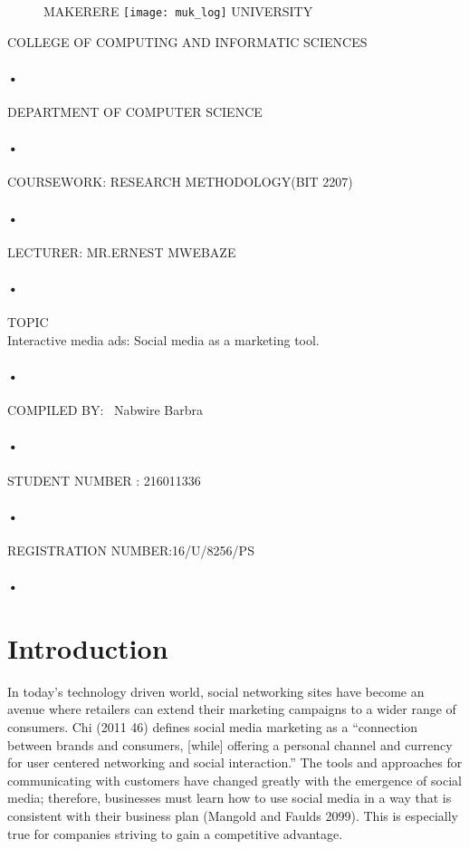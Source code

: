 \documentclass[10pt]{article}
\begin{document}


\begin{titlepage}
  \begin{figure}[h]
  \centerline{\small MAKERERE 
  \texttt{[image: muk\_log]} UNIVERSITY}
\end{figure}
\centerline{COLLEGE OF COMPUTING AND INFORMATIC SCIENCES}
\paragraph{•}
\centerline{DEPARTMENT OF COMPUTER SCIENCE\\}
\paragraph{•}
\centerline{COURSEWORK: RESEARCH METHODOLOGY(BIT 2207)\\}
\paragraph{•}
\centerline{LECTURER: MR.ERNEST MWEBAZE}
\paragraph{•}
\centerline{TOPIC\\ Interactive media ads: Social media as a marketing tool.}  
\paragraph{•}
\centerline{COMPILED BY: \
 Nabwire Barbra}
 \paragraph{•}
\centerline{STUDENT NUMBER : 216011336 }
\paragraph{•}
\centerline{REGISTRATION NUMBER:16/U/8256/PS}
\paragraph{•}
\end{titlepage}
\newpage
{}
\section{Introduction}
In today’s technology driven world, social networking sites have become an avenue
where retailers can extend their marketing campaigns to a wider range of consumers. Chi (2011
46) defines social media marketing as a “connection between brands and consumers, [while]
offering a personal channel and currency for user centered networking and social interaction.”
The tools and approaches for communicating with customers have changed greatly with the
emergence of social media; therefore, businesses must learn how to use social media in a way
that is consistent with their business plan (Mangold and Faulds 2099). This is especially true for
companies striving to gain a competitive advantage.
\end{document}
